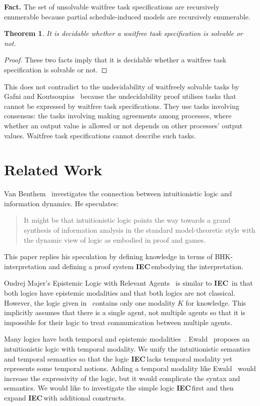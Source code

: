 \documentclass[doctor]{iscs-thesis}
\newcommand{\iec}{{\rm {\textbf{IEC}}}}
\newtheorem{theorem}{Theorem}
\begin{document}
\noindent \textbf{Fact.} The set of unsolvable waitfree task
specifications are recursively enumerable because partial schedule-induced
models are recursively enumerable.

\begin{theorem}
 \label{wf-dec}
 It is decidable whether a waitfree task
specification is solvable or not.
\end{theorem}
\begin{proof}
These two facts imply that it is decidable whether a waitfree task
specification is solvable or not.
\end{proof}

This does not contradict to the undecidability
 of waitfreely solvable tasks by Gafni and
 Koutsoupias~\cite{gafni1999three}
 because the undecidability proof
utilises tasks that cannot be expressed by waitfree task specifications.
They use tasks involving consensus:
the tasks involving making agreements among processes, where
whether an output value is allowed or not depends on other processes'
output values.  Waitfree task specifications cannot describe such tasks.

\section{Related Work}
\label{related}

Van Benthem~\cite{van2009information} investigates the connection between
intuitionistic logic and information dynamics.  He speculates:
\begin{quotation}
It might be
that intuitionistic logic points the way towards a grand synthesis of information analysis
in the standard model-theoretic style with the dynamic view of logic as embodied
in proof and games.
\end{quotation}
This paper replies his speculation by defining knowledge in terms of BHK-interpretation
and defining a proof system \iec\,embodying the interpretation.

Ondrej Majer's 
Epistemic Logic with Relevant Agents~\cite{majer-epistemic}
is similar to \iec\, in that both logics have epistemic modalities and that both logics are
not classical.
However, the logic given in~\cite{majer-epistemic}
 contains only one modality $K$ for knowledge.
This implicitly assumes that there is a single agent, not multiple agents so that it is
impossible for their logic to treat communication between multiple agents.

Many logics have both temporal and epistemic modalities~\cite{sato13study, wozna2005logic}.
Ewald~\cite{1986} proposes an intuitionistic logic with temporal modality.
We unify the intuitionistic semantics and temporal semantics so that the logic
\iec\,lacks temporal modality yet represents some temporal notions.
Adding a temporal modality like Ewald~\cite{1986} would increase the expressivity of the
logic, but it would complicate the syntax and semantics.
We would like to investigate the simple logic \iec\,first
 and then expand \iec\,with
additional constructs.
\end{document}

